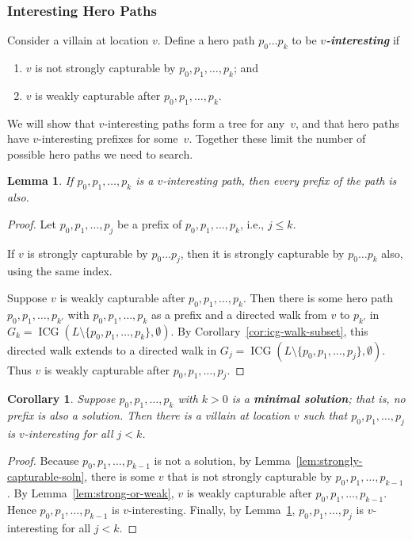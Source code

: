 \documentclass[11pt,letterpaper]{article}
\def\defn#1{\textbf{\textit{\boldmath #1}}}
\newcommand{\ICG}{\operatorname{ICG}}
\theoremstyle{plain}
\newtheorem{lemma}[theorem]{Lemma}
\newtheorem{corollary}[theorem]{Corollary}
\theoremstyle{definition}
\theoremstyle{remark}
\numberwithin{equation}{section}
\begin{document}
\subsubsection{Interesting Hero Paths}

Consider a villain at location $v$.
Define a hero path $p_0 \dots p_k$ to be \defn{$v$-interesting} if
\begin{enumerate}
\item $v$ is not strongly capturable by \(p_0, p_1, \ldots, p_k\); and
\item $v$ is weakly capturable after \(p_0, p_1, \ldots, p_k\).
\end{enumerate}

We will show that $v$-interesting paths form a tree for any~$v$,
and that hero paths have $v$-interesting prefixes for some~$v$.
Together these limit the number of possible hero paths we need to search.

\begin{lemma}
  \label{lem:interesting-prefix}
  If $p_0, p_1, \ldots, p_k$ is a $v$-interesting path,
  then every prefix of the path is also.
\end{lemma}
\begin{proof}
  Let \(p_0, p_1, \ldots, p_j\) be a prefix of \(p_0, p_1, \ldots, p_k\),
  i.e., $j \leq k$.

  If $v$ is strongly capturable by \(p_0 \ldots p_j\),
  then it is strongly capturable by \(p_0 \ldots p_k\) also,
  using the same index.

  Suppose $v$ is weakly capturable after $p_0, p_1, \ldots, p_k$.
  Then there is some hero path \(p_0, p_1, \ldots, p_{k'}\)
  with \(p_0, p_1, \ldots, p_k\) as a prefix
  and a directed walk from \(v\) to \(p_{k'}\)
  in \(G_k = \ICG(L \setminus \{p_0, p_1, \ldots, p_k\}, \emptyset)\).
  By Corollary~\ref{cor:icg-walk-subset},
  this directed walk extends to a directed walk in
  \(G_j = \ICG(L \setminus \{p_0, p_1, \ldots, p_j\}, \emptyset)\).
  Thus \(v\) is weakly capturable after \(p_0, p_1, \ldots, p_j\).
\end{proof}

\begin{corollary}
  \label{cor:minimal-interesting}
  Suppose \(p_0, p_1, \ldots, p_k\) with \(k > 0\)
  is a \defn{minimal solution}; that is, no prefix is also a solution.
  Then there is a villain at location \(v\)
  such that \(p_0, p_1, \ldots, p_j\) is \(v\)-interesting for all \(j < k\).
\end{corollary}
\begin{proof}
  Because \(p_0, p_1, \ldots, p_{k-1}\) is not a solution,
  by Lemma~\ref{lem:strongly-capturable-soln}, there is some \(v\)
  that is not strongly capturable by \(p_0, p_1, \ldots, p_{k-1}\).
  By Lemma~\ref{lem:strong-or-weak},
  \(v\) is weakly capturable after \(p_0, p_1, \ldots, p_{k-1}\).
  Hence \(p_0, p_1, \ldots, p_{k-1}\) is \(v\)-interesting.
  Finally, by Lemma~\ref{lem:interesting-prefix},
  \(p_0, p_1, \ldots, p_j\) is \(v\)-interesting for all \(j < k\).
\end{proof}
\end{document}
